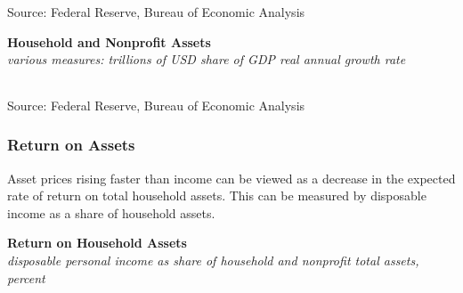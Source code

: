 \documentclass{report}
\makeatletter
\newcommand{\tbllink}[1]{\href{https://raw.githubusercontent.com/bdecon/US-chartbook/master/chartbook/data/#1}{\faTable}}
\newcommand*\short[1]{\expandafter\@gobbletwo\number\numexpr#1\relax}
\newcommand{\dateaxisticks}{
		date coordinates in=x, axis line style={draw=none},
		xmax={2023-11-30},
		max space between ticks=40,	    
		xtick={{1990-01-01}, {1992-01-01}, {1994-01-01}, 
			{1996-01-01}, {1998-01-01}, {2000-01-01}, 
			{2002-01-01}, {2004-01-01}, {2006-01-01},
			{2008-01-01}, {2010-01-01}, {2012-01-01}, {2014-01-01},
		    {2016-01-01}, {2018-01-01}, {2020-01-01}, {2022-01-01}, 
		    {2024-01-01}, {2026-01-01}},
		minor xtick={{1989-01-01}, {1991-01-01}, {1993-01-01},
			{1995-01-01}, {1997-01-01}, {1999-01-01}, 
			{2001-01-01}, {2003-01-01}, {2005-01-01}, {2007-01-01},
		    {2009-01-01}, {2011-01-01}, {2013-01-01}, {2015-01-01},
		    {2017-01-01}, {2019-01-01}, {2021-01-01}, {2023-01-01}, 
		    {2025-01-01}, {2027-01-01}},
		enlarge y limits={0.06}, enlarge x limits={0.01},
		xticklabel style={align=center, yshift=-2pt}, tick label style={inner sep=0pt},
		}
\newcommand{\bbar}[2]{extra #1 ticks = {{#2}}, extra #1 tick labels = ,
		extra #1 tick style = {grid=major, grid style={thick, black!25}},}
\newcommand{\stdline}[4]{\addplot[very thick, no markers, color=#1] 
		table [x=#2, y=#3, col sep=comma] {#4};	}
\newcommand{\rbars}{
		\fill[color=black!10] (axis cs:{1990-07-01},\pgfkeysvalueof{/pgfplots/ymin}) rectangle 
			(axis cs:{1991-03-01}, \pgfkeysvalueof{/pgfplots/ymax});
		\fill[color=black!10] (axis cs:{2007-12-01},\pgfkeysvalueof{/pgfplots/ymin}) rectangle 
			(axis cs:{2009-07-01}, \pgfkeysvalueof{/pgfplots/ymax});
		\fill[color=black!10] (axis cs:{2001-03-01},\pgfkeysvalueof{/pgfplots/ymin}) rectangle 
			(axis cs:{2001-11-01}, \pgfkeysvalueof{/pgfplots/ymax});
		\fill[color=black!10] (axis cs:{2020-02-01},\pgfkeysvalueof{/pgfplots/ymin}) rectangle 
			(axis cs:{2020-05-01}, \pgfkeysvalueof{/pgfplots/ymax});}
\makeatother
\begin{document}
{\begin{minipage}{0.76\textwidth}
\footnotesize{Source: Federal Reserve, Bureau of Economic Analysis} \hfill \tbllink{hh_asset_growth.csv}
\end{minipage}
\newpage
\begin{minipage}{0.76\textwidth}  
\normalsize \textbf{Household and Nonprofit Assets}\\
\footnotesize{\textit{various measures: \hspace{22mm} trillions of USD \hspace{5mm} share of GDP \hspace{5mm} real annual growth rate}}
\vspace*{-3.5mm}

 \setlength{\tabcolsep}{1.8pt} \color{black!90}
	{\renewcommand{\arraystretch}{1.6}
		 \hspace*{-1mm} \begin{tabular}{p{4mm} p{46mm} R{9.6mm} R{10.6mm} R{8.7mm}
		  R{10.4mm} R{9.2mm} R{9.2mm} }
			  \hline
	\end{tabular}}\vspace{-1.5mm}

\footnotesize{Source: Federal Reserve, Bureau of Economic Analysis} \hfill \tbllink{hhasset_table.csv}
\vspace{7mm}

\subsubsection*{Return on Assets}
\small Asset prices rising faster than income can be viewed as a decrease in the expected rate of return on total household assets. This can be measured by disposable income as a share of household assets.  
\vspace{2mm}

\normalsize \textbf{Return on Household Assets}\\
\footnotesize{\textit{disposable personal income as share of household and nonprofit total assets, percent}}
\vspace{3.3cm}

\hspace{2mm} 


\end{minipage}}
\end{document}
